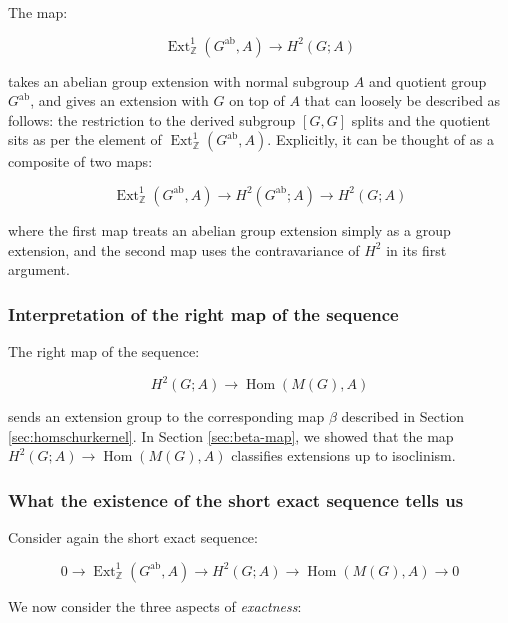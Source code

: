 \documentclass{ucetd}
\begin{document}
The map:

$$\operatorname{Ext}^1_{\mathbb{Z}}(G^{\operatorname{ab}},A) \to H^2(G;A)$$

takes an abelian group extension with normal subgroup $A$ and quotient
group $G^{\operatorname{ab}}$, and gives an extension with $G$ on top
of $A$ that can loosely be described as follows: the restriction to
the derived subgroup $[G,G]$ splits and the quotient sits as per the
element of
$\operatorname{Ext}^1_{\mathbb{Z}}(G^{\operatorname{ab}},A)$. Explicitly,
it can be thought of as a composite of two maps:

$$\operatorname{Ext}^1_{\mathbb{Z}}(G^{\operatorname{ab}},A) \to H^2(G^{\operatorname{ab}};A) \to H^2(G;A)$$

where the first map treats an abelian group extension simply as a
group extension, and the second map uses the contravariance of $H^2$
in its first argument.

\subsubsection{Interpretation of the right map of the sequence}\label{sec:ses-uct-right-map}

The right map of the sequence:

$$H^2(G;A) \to \operatorname{Hom}(M(G),A)$$

sends an extension group to the corresponding map $\beta$ described in
Section \ref{sec:homschurkernel}. In Section \ref{sec:beta-map}, we
showed that the map $H^2(G;A) \to \operatorname{Hom}(M(G),A)$
classifies extensions up to isoclinism.

\subsubsection{What the existence of the short exact sequence tells us}

Consider again the short exact sequence:

\begin{equation*}
  0 \to \operatorname{Ext}^1_{\mathbb{Z}}(G^{\operatorname{ab}},A) \to H^2(G;A) \to \operatorname{Hom}(M(G),A) \to 0
\end{equation*}

We now consider the three aspects of {\em exactness}:
\end{document}
